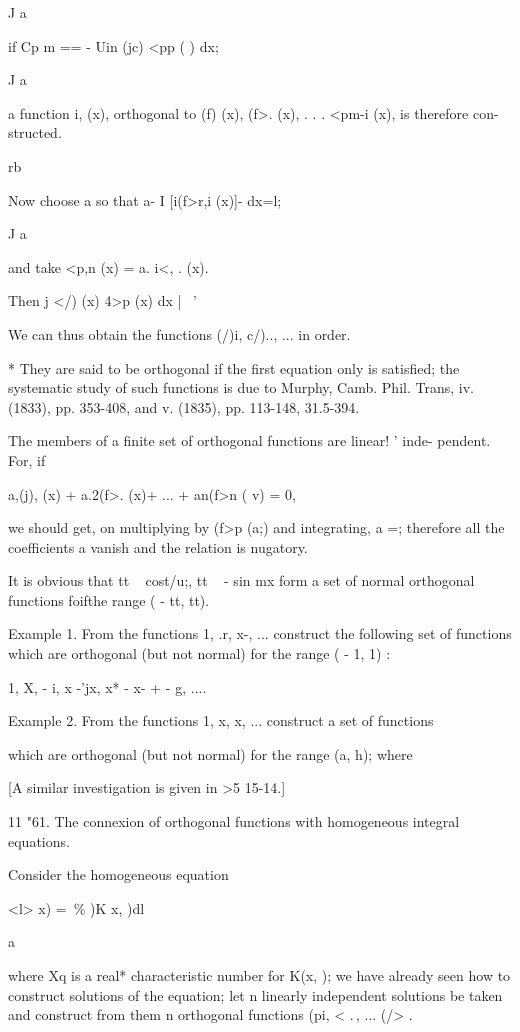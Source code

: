 {J a

if Cp m == - Uin (jc) <pp ( ) dx;

J a

a function i, (x), orthogonal to (f) (x), (f>. (x), . . . <pm-i (x),
is therefore con- structed.

rb

Now choose a so that a- I [i(f>r,i (x)]- dx=l;

J a

and take <p,n (x) = a. i<, . (x).

Then j </) (x) 4>p (x) dx |~ '

We can thus obtain the functions (/)i, c/).., ... in order.

* They are said to be orthogonal if the first equation only is
satisfied; the systematic study of such functions is due to Murphy,
Camb. Phil. Trans, iv. (1833), pp. 353-408, and v. (1835), pp.
113-148, 31.5-394.

%
%

The members of a finite set of orthogonal functions are linear! '
inde- pendent. For, if

a,(j), (x) + a.2(f>. (x)+ ... + an(f>n ( v) = 0,

we should get, on multiplying by (f>p (a;) and integrating, a =;
therefore all the coefficients a vanish and the relation is nugatory.

It is obvious that tt ~ cost/u;, tt ~ - sin mx form a set of normal
orthogonal functions foifthe range ( - tt, tt).

Example 1. From the functions 1, .r, x-, ... construct the following
set of functions which are orthogonal (but not normal) for the range (
- 1, 1) :

1, X, - i, x -'jx, x* - x- + - g, ....

Example 2. From the functions 1, x, x, ... construct a set of
functions

which are orthogonal (but not normal) for the range (a, h); where

[A similar investigation is given in >5 15-14.]

11 "61. The connexion of orthogonal functions with homogeneous
integral equations.

Consider the homogeneous equation

<l> x) = \,\% )K x, )dl

  a

where Xq is a real* characteristic number for K(x, ); we have already
seen how to construct solutions of the equation; let n linearly
independent solutions be taken and construct from them n orthogonal
functions (pi, < .\,, ... (/> .

}
